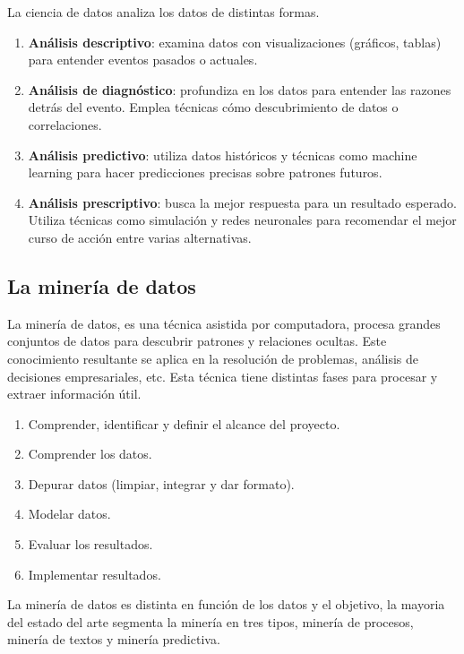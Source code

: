 La ciencia de datos analiza los datos de distintas formas.

\begin{enumerate}
  \item \textbf{Análisis descriptivo}: examina datos con visualizaciones (gráficos, tablas) para entender eventos pasados o actuales.
  \item \textbf{Análisis de diagnóstico}: profundiza en los datos para entender las razones detrás del evento. Emplea técnicas cómo descubrimiento de datos o correlaciones.
  \item \textbf{Análisis predictivo}: utiliza datos históricos y técnicas como machine learning para hacer predicciones precisas sobre patrones futuros.
  \item \textbf{Análisis prescriptivo}: busca la mejor respuesta para un resultado esperado. Utiliza técnicas como simulación y redes neuronales para recomendar el mejor curso de acción entre varias alternativas.
\end{enumerate}


\subsection{La minería de datos}

La minería de datos, es una técnica asistida por computadora, procesa grandes conjuntos de datos para descubrir patrones y relaciones ocultas. Este conocimiento resultante se aplica en la resolución de problemas, análisis de decisiones empresariales, etc. Esta técnica tiene distintas fases para procesar y extraer información útil.

\begin{enumerate}
  \item Comprender, identificar y definir el alcance del proyecto.
  \item Comprender los datos.
  \item Depurar datos (limpiar, integrar y dar formato).
  \item Modelar datos.
  \item Evaluar los resultados.
  \item Implementar resultados.
\end{enumerate}

La minería de datos es distinta en función de los datos y el objetivo, la mayoria del estado del arte segmenta la minería en tres tipos, minería de procesos, minería de textos y minería predictiva.

